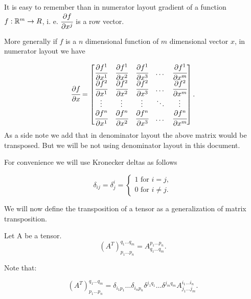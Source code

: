 \documentclass[main.tex]{subfiles}
\begin{document}
It is easy to remember than in numerator layout gradient of a function $f:\mathbb{R}^m\to R$, i. e. $\cfrac{\partial f}{\partial x^j}$ is a row vector.

More generally if $f$ is a $n$ dimensional function of $m$ dimensional vector $x$, in numerator layout we have

\begin{equation}
\cfrac{\partial f}{\partial x} = \begin{bmatrix}
    \cfrac{\partial f^1}{\partial x^1} & \cfrac{\partial f^1}{\partial x^2} & \cfrac{\partial f^1}{\partial x^3} & \dots  & \cfrac{\partial f^1}{\partial x^m} \\
    \cfrac{\partial f^2}{\partial x^1} & \cfrac{\partial f^2}{\partial x^2} & \cfrac{\partial f^2}{\partial x^3} & \dots  & \cfrac{\partial f^2}{\partial x^m} \\
    
    \vdots & \vdots & \vdots & \ddots & \vdots \\
    \cfrac{\partial f^n}{\partial x^1} & \cfrac{\partial f^n}{\partial x^2} & \cfrac{\partial f^n}{\partial x^3} & \dots  & \cfrac{\partial f^n}{\partial x^m} \\
\end{bmatrix}.
\end{equation}
As a side note we add that in denominator layout the above matrix would be transposed. But we will be not using denominator layout in this document.

For convenience we will use Kronecker deltas as follows

\begin{equation}
    \delta_{ij} = \delta^i_j =
    \begin{cases}
      1 \text{ for } i = j,\\
      0 \text{ for } i \not= j.
    \end{cases}
\end{equation}

We will now define the transposition of a tensor as a generalization of matrix transposition.

\begin{definition}
Let A be a tensor.
\begin{equation}
(A^T)^{q_1\dots q_m}_{p_1\dots p_n} =
A^{p_1\dots p_n}_{q_1\dots q_m}.
\end{equation}

Note that:


\begin{equation}
(A^T)^{q_1\dots q_m}_{p_1\dots p_n} =
\delta_{i_1 p_1} \dots \delta_{i_n p_n} \delta^{j_1 q_1} \dots \delta^{j_m q_m} A^{i_1\dots i_n}_{j_1\dots j_m}.
\end{equation}
\end{definition}
\end{document}
